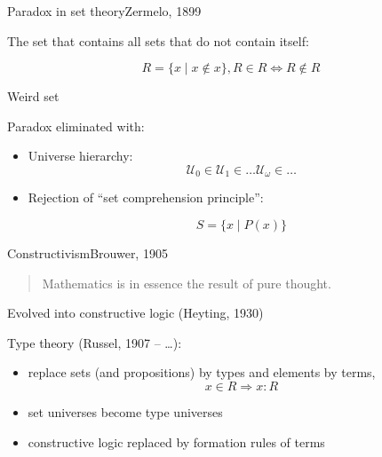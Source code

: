 \documentclass[english]{beamer}
\begin{document}
\begin{frame}{Paradox in set theory}{Zermelo, 1899}

The set that contains all sets that do not contain itself:


    \[ R = \{x \mid x \not \in x \}, R\in R \Leftrightarrow R \not \in R \]
    
Weird set
    
    \pause
    
    Paradox eliminated with:
    \begin{itemize}
    \item Universe hierarchy:
        \[\mathcal{U}_0 \in \mathcal{U}_1 \in \ldots \mathcal{U}_{\omega} \in \ldots \]
        
    \item Rejection of ``set comprehension principle'':
    
    \[ S = \{ x \mid P (x ) \} \]
    \end{itemize}
    
    
\end{frame}

\begin{frame}{Constructivism}{Brouwer, 1905}

\begin{quotation}
Mathematics is in essence the result of pure thought.
\end{quotation}

Evolved into constructive logic (Heyting, 1930)

\pause

Type theory (Russel, 1907 -- \ldots):

\begin{itemize}
\item replace sets (and propositions) by types and elements by terms, $$x \in R \Rightarrow x : R$$
\item set universes become type universes
\item constructive logic replaced by formation rules of terms
\end{itemize}

\end{frame}


%     
%             
%     
%             
%     
\end{document}
